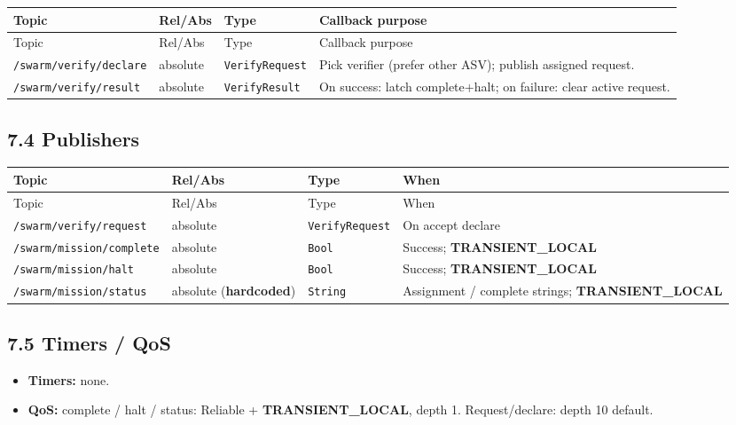 \begin{center}
\small
\begin{longtable}{@{}lllp{5.2cm}@{}}
\toprule
Topic & Rel/Abs & Type & Callback purpose \\
\midrule
\endfirsthead
\toprule
Topic & Rel/Abs & Type & Callback purpose \\
\midrule
\endhead
\texttt{/swarm/verify/declare} & absolute & \texttt{VerifyRequest} & Pick verifier (prefer other ASV); publish assigned request. \\
\texttt{/swarm/verify/result} & absolute & \texttt{VerifyResult} & On success: latch complete+halt; on failure: clear active request. \\
\bottomrule
\end{longtable}
\end{center}


\subsection{7.4 Publishers}


\begin{center}
\small
\begin{longtable}{@{}lllp{5.2cm}@{}}
\toprule
Topic & Rel/Abs & Type & When \\
\midrule
\endfirsthead
\toprule
Topic & Rel/Abs & Type & When \\
\midrule
\endhead
\texttt{/swarm/verify/request} & absolute & \texttt{VerifyRequest} & On accept declare \\
\texttt{/swarm/mission/complete} & absolute & \texttt{Bool} & Success; \textbf{TRANSIENT\_LOCAL} \\
\texttt{/swarm/mission/halt} & absolute & \texttt{Bool} & Success; \textbf{TRANSIENT\_LOCAL} \\
\texttt{/swarm/mission/status} & absolute (\textbf{hardcoded}) & \texttt{String} & Assignment / complete strings; \textbf{TRANSIENT\_LOCAL} \\
\bottomrule
\end{longtable}
\end{center}


\subsection{7.5 Timers / QoS}


\begin{itemize}[leftmargin=*]
\item \textbf{Timers:} none.
\item \textbf{QoS:} complete / halt / status: Reliable + \textbf{TRANSIENT\_LOCAL}, depth 1. Request/declare: depth 10 default.
\end{itemize}


